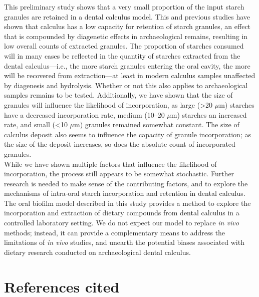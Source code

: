 \documentclass[
  b5paper,
]{book}
\begin{document}
This preliminary study shows that a very small proportion of the input
starch granules are retained in a dental calculus model. This and
previous studies have shown that calculus has a low capacity for
retention of starch granules, an effect that is compounded by diagenetic
effects in archaeological remains, resulting in low overall counts of
extracted granules. The proportion of starches consumed will in many
cases be reflected in the quantity of starches extracted from the dental
calculus---i.e., the more starch granules entering the oral cavity, the
more will be recovered from extraction---at least in modern calculus
samples unaffected by diagenesis and hydrolysis. Whether or not this
also applies to archaeological samples remains to be tested.
Additionally, we have shown that the size of granules will influence the
likelihood of incorporation, as large (\textgreater20 \(\mu\)m) starches
have a decreased incorporation rate, medium (10--20 \(\mu\)m) starches
an increased rate, and small (\textless10 \(\mu\)m) granules remained
somewhat constant. The size of calculus deposit also seems to influence
the capacity of granule incorporation; as the size of the deposit
increases, so does the absolute count of incorporated granules.\\
While we have shown multiple factors that influence the likelihood of
incorporation, the process still appears to be somewhat stochastic.
Further research is needed to make sense of the contributing factors,
and to explore the mechanisms of intra-oral starch incorporation and
retention in dental calculus. The oral biofilm model described in this
study provides a method to explore the incorporation and extraction of
dietary compounds from dental calculus in a controlled laboratory
setting. We do not expect our model to replace \emph{in vivo} methods;
instead, it can provide a complementary means to address the limitations
of \emph{in vivo} studies, and unearth the potential biases associated
with dietary research conducted on archaeological dental calculus.

\hypertarget{references-cited-3}{%
\section*{References cited}\label{references-cited-3}}

\end{document}
